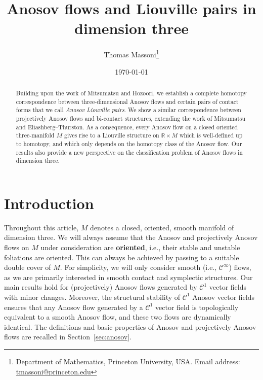 \documentclass[letterpaper, 11pt]{article}
\title{Anosov flows and Liouville pairs in dimension three}
\author{Thomas Massoni\thanks{Department of Mathematics, Princeton University, USA. Email address: \href{mailto:tmassoni@princeton.edu}{tmassoni@princeton.edu}}}
\date{\today}
\numberwithin{equation}{section}
\newcommand{\R}{\mathbb{R}}
\begin{document}
\maketitle


\begin{abstract}
Building upon the work of Mitsumatsu and Hozoori, we establish a complete homotopy correspondence between three-dimensional Anosov flows and certain pairs of contact forms that we call \emph{Anosov Liouville pairs}. We show a similar correspondence between projectively Anosov flows and bi-contact structures, extending the work of Mitsumatsu and Eliashberg--Thurston. As a consequence, every Anosov flow on a closed oriented three-manifold $M$ gives rise to a Liouville structure on $\R \times M$ which is well-defined up to homotopy, and which only depends on the homotopy class of the Anosov flow. Our results also provide a new perspective on the classification problem of Anosov flows in dimension three.
\end{abstract}


\maketitle

\tableofcontents


\section{Introduction}

Throughout this article, $M$ denotes a closed, oriented, smooth manifold of dimension three. We will always assume that the Anosov and projectively Anosov flows on $M$ under consideration are \textbf{oriented}, i.e., their stable and unstable foliations are oriented. This can always be achieved by passing to a suitable double cover of $M$. For simplicity, we will only consider smooth (i.e., $\mathcal{C}^\infty$) flows, as we are primarily interested in smooth contact and symplectic structures. Our main results hold for (projectively) Anosov flows generated by $\mathcal{C}^1$ vector fields with minor changes. Moreover, the structural stability of $\mathcal{C}^1$ Anosov vector fields~\cite{R75} ensures that any Anosov flow generated by a $\mathcal{C}^1$ vector field is topologically equivalent to a smooth Anosov flow, and these two flows are dynamically identical. The definitions and basic properties of Anosov and projectively Anosov flows are recalled in Section~\ref{sec:anosov}.
\end{document}
